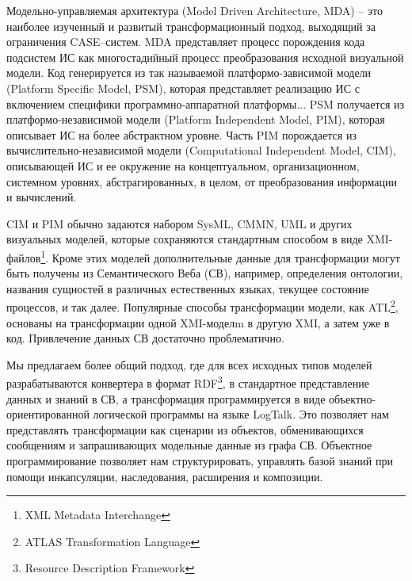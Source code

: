 \documentclass[conference]{IEEEtran} \IEEEoverridecommandlockouts
\begin{document}
Модельно-управляемая архитектура (Model Driven Architecture, MDA) -- это наиболее изученный и развитый трансформационный подход, выходящий за ограничения CASE--систем. MDA представляет процесс порождения кода подсистем ИС как многостадийный процесс преобразования исходной визуальной модели. Код генерируется из так называемой платформо-зависимой модели (Platform Specific Model, PSM), которая представляет реализацию ИС с включением специфики программно-аппаратной платформы... PSM получается из платформо-независимой модели (Platform Independent Model, PIM), которая описывает ИС на более абстрактном уровне. Часть PIM порождается из вычислительно-независимой модели (Computational Independent Model, CIM), описывающей ИС и ее окружение на концептуальном, организационном, системном уровнях, абстрагированных, в целом, от преобразования информации и вычислений.

CIM и PIM обычно задаются набором SysML, CMMN, UML и других визуальных моделей, которые сохраняются стандартным способом в виде XMI-файлов\footnote{XML Metadata Interchange}. Кроме этих моделей дополнительные данные для трансформации могут быть получены из Семантического Веба (СВ), например, определения онтологии, названия сущностей в различных естественных языках, текущее состояние процессов, и так далее. Популярные способы трансформации модели, как ATL\footnote{ATLAS Transformation Language}, основаны на трансформации одной XMI-моделm в другую XMI, а затем уже в код. Привлечение данных СВ достаточно проблематично.

Мы предлагаем более общий подход, где для всех исходных типов моделей разрабатываются конвертера в формат RDF\footnote{Resource Description Framework}, в стандартное представление данных и знаний в СВ, а трансформация программируется в виде объектно-ориентированной логической программы на языке LogTalk. Это позволяет нам представлять трансформации как сценарии из объектов, обменивающихся сообщениям и запрашивающих модельные данные из графа СВ. Объектное программирование позволяет нам структурировать, управлять базой знаний при помощи инкапсуляции, наследования, расширения и композиции.
\end{document}
